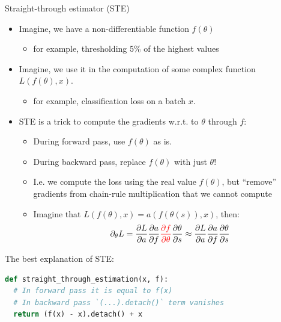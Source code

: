 \documentclass[10pt]{beamer}
\begin{document}
\begin{frame}[fragile]{Straight-through estimator (STE)}
\begin{itemize}
    \item Imagine, we have a non-differentiable function $f(\theta)$
    \begin{itemize}
        \item\pause for example, thresholding 5\% of the highest values
    \end{itemize}
    \item Imagine, we use it in the computation of some complex function $L(f(\theta), x)$.
    \begin{itemize}
        \item\pause for example, classification loss on a batch $x$.
    \end{itemize}
    \item\pause STE is a trick to compute the gradients w.r.t. to $\theta$ through $f$:
    \begin{itemize}
        \item\pause During forward pass, use $f(\theta)$ as is.
        \item\pause During backward pass, replace $f(\theta)$ with just $\theta$!
        \item\pause I.e. we compute the loss using the real value $f(\theta)$, but ``remove'' gradients from chain-rule multiplication that we cannot compute
        \item\pause Imagine that $L(f(\theta), x) = a(f(\theta(s)), x)$, then:
        \begin{equation*}
            \partial_\theta L = \frac{\partial L}{\partial a} \frac{\partial a}{\partial f} \textcolor{red}{\frac{\partial f}{\partial \theta}} \frac{\partial \theta}{\partial s} \approx \frac{\partial L}{\partial a} \frac{\partial a}{\partial f} \frac{\partial \theta}{\partial s}
        \end{equation*}
    \end{itemize}
\end{itemize}

\pause
The best explanation of STE:

\begin{lstlisting}[language=Python]
def straight_through_estimation(x, f):
  # In forward pass it is equal to f(x)
  # In backward pass `(...).detach()` term vanishes
  return (f(x) - x).detach() + x
\end{lstlisting}



\end{frame}
\end{document}
